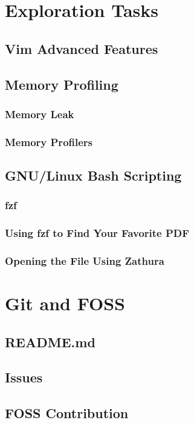 \documentclass{article}
\begin{document}
\section{Exploration Tasks}
\subsection{Vim Advanced Features}


\subsection{Memory Profiling}

\subsubsection{Memory Leak}

\subsubsection{Memory Profilers}

\subsection{GNU/Linux Bash Scripting}

\subsubsection{fzf}

\subsubsection{Using fzf to Find Your Favorite PDF}

\subsubsection{Opening the File Using Zathura}

\section{Git and FOSS}
\subsection{README.md}

\subsection{Issues}

\subsection{FOSS Contribution}
\end{document}
